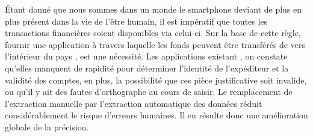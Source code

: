 Étant donné que nous sommes dans un monde le smartphone deviant de plus en plus présent dans la vie  de l'être humain, il est impératif que toutes les transactions financières soient disponibles via celui-ci.  Sur la base de cette règle, fournir une application à travers laquelle les fonds peuvent être transférés de  vers l'intérieur du pays , est une nécessité.  Les applications existant , on constate qu'elles manquent de rapidité pour déterminer l'identité de l'expéditeur et la validité des comptes, en plus, la possibilité que ces pièce justificative soit invalide, ou qu'il y ait des fautes d'orthographe au cours de saisir.\newline
Le remplacement de l’extraction manuelle par l’extraction automatique des données réduit considérablement le risque d’erreurs humaines. Il en résulte donc une amélioration globale de la précision. 



 




\begin{comment}
On l’entend désormais partout, le processus KYC (Know Your Customer) se déploie dans de nombreux secteurs d’activité. Véritable atout pour combattre la fraude et l’usurpation d’identité, un processus KYC, lorsqu’il est correctement déployé, offre aujourd’hui une multitude d’avantages aux utilisateurs comme aux entreprises. Mais quelles fonctions et quels usages se cachent derrière cet acronyme ? Comment a-t-il vu le jour et comment évolue-t-il face à la digitalisation des entreprises ? Découvrez, à travers ce guide, les atouts qu’un processus KYC automatisé peut apporter, ainsi que les différentes étapes qui en font une réussite.
\end{comment}